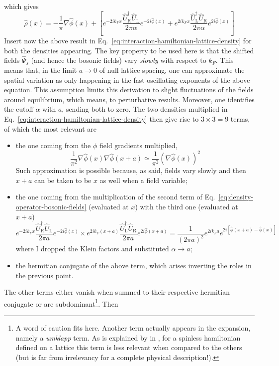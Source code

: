 which gives
\begin{equation}\label{eq:density-operator-bosonic-fields}
	\hat \rho(x) = - \frac{1}{\pi} \nabla \hat \phi(x) + \left[
		e^{-2ik_F x}
		\frac{\hat U_\mathrm{R}^\dagger \hat U_\mathrm{L}}{2\pi\alpha} e^{-2i\hat \phi(x)}
		+ e^{2ik_F x}
		\frac{\hat U_\mathrm{L}^\dagger \hat U_\mathrm{R}}{2\pi\alpha} e^{2i\hat \phi(x)} 
	\right]
\end{equation}
Insert now the above result in Eq.~\eqref{eq:interaction-hamiltonian-lattice-density} for both the densities appearing. The key property to be used here is that the shifted fields $\hat \Psi_s$ (and hence the bosonic fields) vary \textit{slowly} with respect to $k_F$. This means that, in the limit $a \to 0$ of null lattice spacing, one can approximate the spatial variation as only happening in the fast-oscillating exponents of the above equation. This assumption limits this derivation to slight fluctuations of the fields around equilibrium, which means, to perturbative results. Moreover, one identifies the cutoff $\alpha$ with $a$, sending both to zero. The two densities multiplied in Eq.~\eqref{eq:interaction-hamiltonian-lattice-density} then give rise to $3 \times 3 = 9$ terms, of which the most relevant are
\begin{itemize}
	\item the one coming from the $\phi$ field gradients multiplied,
	\[
		\frac{1}{\pi^2} \nabla \hat \phi(x) \nabla \hat \phi(x+a) \simeq \frac{1}{\pi^2} \left( \nabla \hat \phi(x) \right)^2
	\]
	Such approximation is possible because, as said, fields vary slowly and then $x+a$ can be taken to be $x$ as well when a field variable;
	\item the one coming from the multiplication of the second term of Eq.~\eqref{eq:density-operator-bosonic-fields} (evaluated at $x$) with the third one (evaluated at $x+a$)
	\[
		e^{-2ik_F x}
		\frac{\hat U_\mathrm{R}^\dagger \hat U_\mathrm{L}}{2\pi a} e^{-2i\hat \phi(x)} \times
		e^{2ik_F (x+a)}
		\frac{\hat U_\mathrm{L}^\dagger \hat U_\mathrm{R}}{2\pi a} e^{2i\hat \phi(x+a)} = \frac{1}{(2\pi a)^2} e^{2ik_F a} e^{2i \left[ \hat \phi(x+a) - \hat \phi(x) \right]}
	\]
	where I dropped the Klein factors and substituted $\alpha \to a$;
	\item the hermitian conjugate of the above term, which arises inverting the roles in the previous point.
\end{itemize}
The other terms either vanish when summed to their respective hermitian conjugate or are subdominant\footnote{
	A word of caution fits here. Another term actually appears in the expansion, namely a \textit{umklapp} term. As is explained by \citeauthor{giamarchi2003quantum} in \cite[Sec.~6.1.2]{giamarchi2003quantum}, for a spinless hamiltonian defined on a lattice this term is less relevant when compared to the others (but is far from irrelevancy for a complete physical description!).
}. Then

